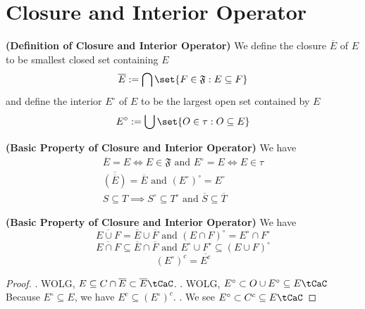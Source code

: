 \documentclass{report}
\begin{document}
\section{Closure and Interior Operator}
\begin{definition}
\label{2.2.1}
\textbf{(Definition of Closure and Interior Operator)} We define the closure $\overline{E}$ of $E$ to be smallest closed set containing $E$
\begin{equation*}
  \overline{E}:=\bigcap \set{F\in\mathfrak{F}:E\subseteq F}
\end{equation*}
and define the interior $E^\circ$ of  $E$ to be the largest open set contained by  $E$ 
\begin{equation*}
E^\circ :=\bigcup  \set{O\in\tau :O \subseteq E}
\end{equation*}
\end{definition}
\begin{theorem}
\label{2.2.2}
\textbf{(Basic Property of Closure and Interior Operator)} We have
\begin{gather*}
  \overline{E}=E\iff E\in\mathfrak{F}\text{ and }E^\circ=E\iff E\in\tau\\
\overline{(\overline{E})}=\overline{E}\text{ and }(E^\circ)^\circ=E^\circ\\
  S\subseteq T \implies S^\circ \subseteq T^\circ\text{ and }\overline{S}\subseteq \overline{T}
\end{gather*}
\end{theorem}
\begin{theorem}
\label{2.2.3}
\textbf{(Basic Property of Closure and Interior Operator)} We have 
\begin{equation*}
   \overline{E\cup F}=\overline{E}\cup \overline{F}\text{ and }(E\cap F)^\circ=E^\circ \cap F^\circ
\end{equation*}
\begin{equation*}
\overline{E\cap F}\subseteq \overline{E}\cap \overline{F}\text{ and }E^\circ \cup F^\circ \subseteq (E\cup F)^\circ 
\end{equation*}
\begin{equation*}
  (E^\circ )^c=\overline{E^c}
\end{equation*}
\end{theorem}
\begin{proof}
. WOLG, $E\subseteq C\cap \overline{E} \subset \overline{E}\tCaC$. . WOLG, $ E^\circ  \subset O\cup  E^\circ \subseteq E\tCaC$\\

Because $E^\circ \subseteq E$, we have $E^c \subseteq (E^\circ )^c$. . We see $E^\circ  \subset C^c\subseteq E\tCaC$
\end{proof}
\end{document}
